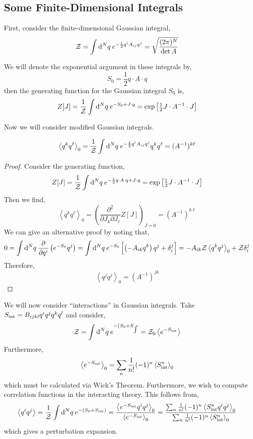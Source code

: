 \documentclass[12pt]{extarticle}
\begin{document}
\subsection{Some Finite-Dimensional Integrals}


First, consider the finite-dimensional Gaussian integral,
\[ \mathcal{Z} = \int \mathrm{d}^{N} q \: e^{-\frac{1}{2} q^i A_{ij} q^j} = \sqrt{\frac{(2 \pi)^N}{\det{A}}}\]

\begin{definition}
We will denote the exponential argument in these integrals by,
\[ S_0 = \frac{1}{2} q \cdot A \cdot q \]
then the generating function for the Gaussian integral $S_0$ is,
\[ Z[J] = \frac{1}{\mathcal{Z}} \int \mathrm{d}^{N} q \: e^{-S_0 + J \cdot q} = \exp{\left[\tfrac{1}{2} J \cdot A^{-1} \cdot J \right]} \]
\end{definition}
Now we will consider modified Gaussian integrals.
\begin{theorem}
\[ \left< q^k q^{\ell} \right>_0 = \frac{1}{\mathcal{Z}} \int \mathrm{d}^{N} q \: e^{- \frac{1}{2} q^i A_{ij} q^j} q^k q^{\ell} = (A^{-1})^{k \ell} \]
\end{theorem}

\begin{proof}
Consider the generating function,
\[ Z[J] = \frac{1}{\mathcal{Z}} \int \mathrm{d}^{N} q \: e^{-\frac{1}{2} q \cdot A \cdot q + J \cdot q} = \exp{\left[\tfrac{1}{2} J \cdot A^{-1} \cdot J \right]} \]
Then we find,
\[ \left< q^k q^{\ell} \right>_0  = \left( \frac{\partial^2}{\partial J_k \partial J_{\ell}} Z[J] \right)_{J = 0} = (A^{-1})^{k \ell} \]
We can give an alternative proof by noting that,
\begin{align*}
0 = \int \mathrm{d}^{N} q \: \frac{\partial{}}{\partial{q^i}} \left( e^{-S_0} q^j \right) = \int \mathrm{d}^{N} q \: e^{-S_0} \left[ \left( - A_{ik} q^k \right) q^j + \delta^j_i \right] = - A_{ik} \mathcal{Z} \left< q^k q^j \right>_0 + \mathcal{Z} \delta^j_i 
\end{align*}
Therefore,
\[ \left< q^j q^j \right>_0 = (A^{-1})^{j k} \]
\end{proof}
We will now consider ``interactions'' in Gaussian integrals. Take $S_{\mathrm{int}} =  B_{ijkl}q^i q^j q^k q^l$ and consider,
\[ \mathcal{Z} = \int \mathrm{d}^{N} q \: e^{-(S_0 + S_{\int}} = \mathcal{Z}_0 \left< e^{- S_{\mathrm{int}} } \right> \]
Furthermore,
\[ 
\left< e^{-S_{\mathrm{int}}} \right>_0 = \sum_n \frac{1}{n!} (-1)^n \left< S_{\mathrm{int}}^n \right>_0 
\]
which must be calculated via Wick's Theorem. Furthermore, we wish to compute correlation functions in the interacting theory. This follows from,
\[ \left< q^i q^j \right> = \frac{1}{\mathcal{Z}} \int \mathrm{d}^{N} q \: e^{-(S_0 + S_{\mathrm{int}})} = \frac{\left< e^{-S_{\mathrm{int}}} q^i q^j \right>_0}{\left< e^{-S_{\mathrm{int}}} \right>_0} = \frac{\sum_n \frac{1}{n!} (-1)^n \left< S_{\mathrm{int}}^n q^i q^j \right>_0}{\sum_n \frac{1}{n!} (-1)^n \left< S_{\mathrm{int}}^n \right>_0 } \]
which gives a perturbation expansion. 
\end{document}
